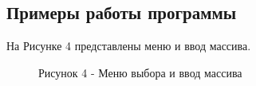 \documentclass[14pt, a4paper]{extarticle}
\begin{document}
	\subsection{Примеры работы программы}
	На Рисунке 4 представлены меню и ввод массива.
	\begin{figure}[h]
		\caption*{Рисунок 4 - Меню выбора и ввод массива}
	\end{figure}
	
\end{document}
